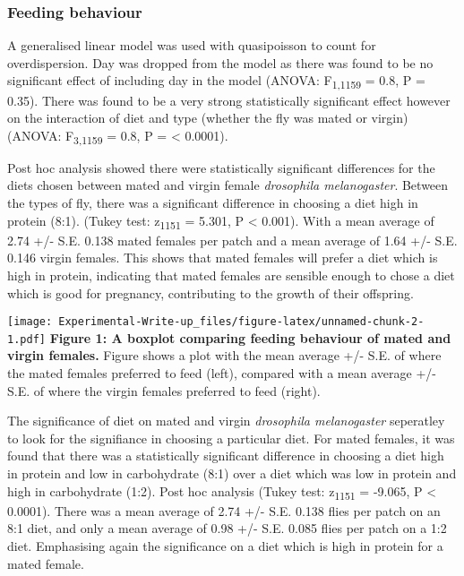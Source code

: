 \documentclass[
]{article}
\begin{document}
\hypertarget{feeding-behaviour-1}{%
\subsubsection{Feeding behaviour}\label{feeding-behaviour-1}}

A generalised linear model was used with quasipoisson to count for
overdispersion. Day was dropped from the model as there was found to be
no significant effect of including day in the model (ANOVA:
F\textsubscript{1,1159} = 0.8, P = 0.35). There was found to be a very
strong statistically significant effect however on the interaction of
diet and type (whether the fly was mated or virgin) (ANOVA:
F\textsubscript{3,1159} = 0.8, P = \textless{} 0.0001).

Post hoc analysis showed there were statistically significant
differences for the diets chosen between mated and virgin female
\emph{drosophila melanogaster}. Between the types of fly, there was a
significant difference in choosing a diet high in protein (8:1). (Tukey
test: z\textsubscript{1151} = 5.301, P \textless{} 0.001). With a mean
average of 2.74 +/- S.E. 0.138 mated females per patch and a mean
average of 1.64 +/- S.E. 0.146 virgin females. This shows that mated
females will prefer a diet which is high in protein, indicating that
mated females are sensible enough to chose a diet which is good for
pregnancy, contributing to the growth of their offspring.

\texttt{[image: Experimental-Write-up\_files/figure-latex/unnamed-chunk-2-1.pdf]}
\textbf{\textbf{Figure 1: A boxplot comparing feeding behaviour of mated
and virgin females.}} Figure shows a plot with the mean average +/- S.E.
of where the mated females preferred to feed (left), compared with a
mean average +/- S.E. of where the virgin females preferred to feed
(right).

The significance of diet on mated and virgin \emph{drosophila
melanogaster} seperatley to look for the signifiance in choosing a
particular diet. For mated females, it was found that there was a
statistically significant difference in choosing a diet high in protein
and low in carbohydrate (8:1) over a diet which was low in protein and
high in carbohydrate (1:2). Post hoc analysis (Tukey test:
z\textsubscript{1151} = -9.065, P \textless{} 0.0001). There was a mean
average of 2.74 +/- S.E. 0.138 flies per patch on an 8:1 diet, and only
a mean average of 0.98 +/- S.E. 0.085 flies per patch on a 1:2 diet.
Emphasising again the significance on a diet which is high in protein
for a mated female.
\end{document}
